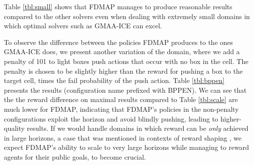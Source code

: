 \documentclass[letterpaper]{article} %
\theoremstyle{definition}
\newcommand{\commentout}[1]{}
\newcommand{\eliran}[1]{\textbf{[\color{red}ELIRAN:#1]}}
\newcommand{\guy}[1]{\textbf{[\color{orange}GUY:#1]}}
\begin{document}
Table \ref{tbl:small} shows that FDMAP manages to produce reasonable results compared to the other solvers even when dealing with extremely small domains in which optimal solvers such as GMAA-ICE can excel.

To observe the difference between the policies FDMAP produces to the ones GMAA-ICE does, we present another variation of the domain, where we add a penalty of 101 to light boxes push actions that occur with no box in the cell. The penalty is chosen to be slightly higher than the reward for pushing a box to the target cell, times the fail probability of the push action. Table \ref{tbl:bppen} presents the results (configuration name prefixed with BPPEN). We can see that the the reward difference on maximal results compared to Table \ref{tbl:scale} are much lower for FDMAP,
indicating that FDMAP's policies in the non-penalty configurations exploit the horizon and avoid blindly pushing, leading to higher-quality results.
If we would handle domains in which reward can be \emph{only} achieved in large horizons, a case that was mentioned in contexts of reward shaping \cite{REWARDSHAPING,REWARDSHAPING2}, we expect FDMAP's ability to scale to very large horizons while managing to reward agents for their public goals, to become crucial.

\commentout{
\section{Related Work}

\guy{This still requires work}
QDec-POMDPs~\cite{QDECPOMDP} are qualitative version of Dec-POMDPS that tackle a conceptually simpler, more structured, model. In QDec-POMDPs 
non-determinism replaces stochastic uncertainty. The model is factored (i.e., described at the level of state variables rather than states), and actions 
are described using preconditions and non-determinstic effects. Although QDec-POMDPs are also NEXT-Time hard, recent work in the area that leverages heuristic-search planners, has been able to scale up to much larger domains (e.g., box pushing on a grid of size 24,  12 agents and 12 boxes, implying a state space of $24^{24}$)
albeit, under the assumptions that actions are deterministic.

Dec-POMDP algorithms.
}
\end{document}
